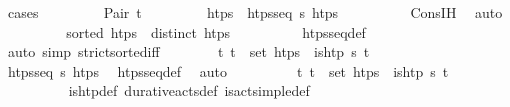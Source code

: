 \begin{isabellebody}
\ {\isacharparenleft}{\kern0pt}cases\ {\isasympi}{\isacharparenright}{\kern0pt}\isanewline
\ \ \ \ \ \ \isamarkupfalse%
\ {\isacharparenleft}{\kern0pt}Pair\ t\isactrlsub {\isasympi}\ {\isasympi}{\isacharprime}{\kern0pt}{\isacharparenright}{\kern0pt}\isanewline
\ \ \ \ \ \ \isamarkupfalse%
\ htps{\isacharprime}{\kern0pt}\ \ {\isachardoublequoteopen}htps{\isacharunderscore}{\kern0pt}seq\ {\isasympi}s\ htps{\isacharprime}{\kern0pt}{\isachardoublequoteclose}\isanewline
\ \ \ \ \ \ \ \ \isamarkupfalse%
\ Cons{\isachardot}{\kern0pt}IH\ \isamarkupfalse%
\ auto\isanewline
\ \ \ \ \ \ \isamarkupfalse%
\ \isamarkupfalse%
\ {\isachardoublequoteopen}sorted\ htps{\isacharprime}{\kern0pt}{\isachardoublequoteclose}\ \ {\isachardoublequoteopen}distinct\ htps{\isacharprime}{\kern0pt}{\isachardoublequoteclose}\isanewline
\ \ \ \ \ \ \ \ \isamarkupfalse%
\ htps{\isacharunderscore}{\kern0pt}seq{\isacharunderscore}{\kern0pt}def\ \isamarkupfalse%
\ {\isacharparenleft}{\kern0pt}auto\ simp{\isacharcolon}{\kern0pt}\ strict{\isacharunderscore}{\kern0pt}sorted{\isacharunderscore}{\kern0pt}iff{\isacharparenright}{\kern0pt}\isanewline
\isanewline
\ \ \ \ \ \ \isamarkupfalse%
\ {\isachardoublequoteopen}{\isasymforall}t{\isachardot}{\kern0pt}\ t\ {\isasymin}\ set\ htps{\isacharprime}{\kern0pt}\ {\isasymlongleftrightarrow}\ is{\isacharunderscore}{\kern0pt}htp\ {\isasympi}s\ t{\isachardoublequoteclose}\isanewline
\ \ \ \ \ \ \ \ \isamarkupfalse%
\ {\isacartoucheopen}htps{\isacharunderscore}{\kern0pt}seq\ {\isasympi}s\ htps{\isacharprime}{\kern0pt}{\isacartoucheclose}\ \isamarkupfalse%
\ htps{\isacharunderscore}{\kern0pt}seq{\isacharunderscore}{\kern0pt}def\ \isamarkupfalse%
\ auto\isanewline
\ \ \ \ \ \ \isamarkupfalse%
\ \isamarkupfalse%
\ {\isachardoublequoteopen}{\isasymforall}t{\isachardot}{\kern0pt}\ t\ {\isasymin}\ set\ htps{\isacharprime}{\kern0pt}\ {\isasymlongrightarrow}\ is{\isacharunderscore}{\kern0pt}htp\ {\isacharparenleft}{\kern0pt}{\isasympi}{\isacharhash}{\kern0pt}{\isasympi}s{\isacharparenright}{\kern0pt}\ t{\isachardoublequoteclose}\isanewline
\ \ \ \ \ \ \ \ \isamarkupfalse%
\ is{\isacharunderscore}{\kern0pt}htp{\isacharunderscore}{\kern0pt}def\ durative{\isacharunderscore}{\kern0pt}acts{\isacharunderscore}{\kern0pt}def\ is{\isacharunderscore}{\kern0pt}act{\isacharunderscore}{\kern0pt}simple{\isacharunderscore}{\kern0pt}def\ \isamarkupfalse%

\end{isabellebody}
